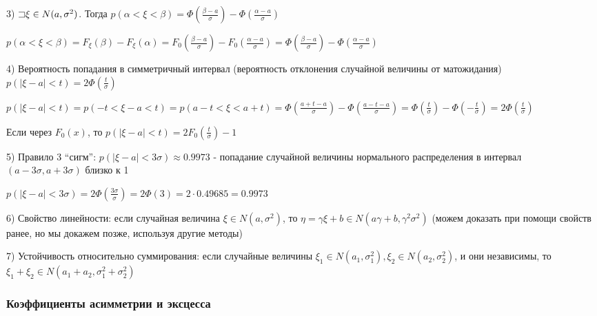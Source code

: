 \documentclass[12pt]{article}
\begin{document}
    3) $\mathord{\sqsupset} \xi \in N(a, \sigma^2)$. Тогда $p(\alpha < \xi < \beta) = \Phi\left(\frac{\beta - a}{\sigma}\right) - \Phi\left(\frac{\alpha - a}{\sigma}\right)$

    \begin{MyProof}
        $p(\alpha < \xi < \beta) = F_\xi(\beta) - F_\xi(\alpha) = F_0\left(\frac{\beta - a}{\sigma}\right) - F_0\left(\frac{\alpha - a}{\sigma}\right) = \Phi\left(\frac{\beta - a}{\sigma}\right) - \Phi\left(\frac{\alpha - a}{\sigma}\right)$
    \end{MyProof}

    4) Вероятность попадания в симметричный интервал (вероятность отклонения случайной величины от матожидания) 
    $p(|\xi - a| < t) = 2\Phi\left(\frac{t}{\sigma}\right)$

    \begin{MyProof}
        $p(|\xi - a| < t) = p(-t < \xi - a < t) = p(a - t < \xi < a + t) = \Phi\left(\frac{a + t - a}{\sigma}\right) - \Phi\left(\frac{a - t - a}{\sigma}\right) = \Phi\left(\frac{t}{\sigma}\right) - \Phi\left(-\frac{t}{\sigma}\right) = 2\Phi\left(\frac{t}{\sigma}\right)$
    \end{MyProof}

    \Notas Если через $F_0(x)$, то $p(|\xi - a| < t) = 2F_0\left(\frac{t}{\sigma}\right) - 1$

    5) Правило 3 \enquote{сигм}: $p(|\xi - a| < 3\sigma) \approx 0.9973$ - попадание случайной величины нормального распределения в интервал $(a - 3\sigma, a + 3\sigma)$ близко к 1

    \begin{MyProof}
        $p(|\xi - a| < 3\sigma) = 2\Phi\left(\frac{3\sigma}{\sigma}\right) = 2\Phi(3) = 2 \cdot 0.49685 = 0.9973$
    \end{MyProof}

    6) Свойство линейности: если случайная величина $\xi \in N(a, \sigma^2)$, то $\eta = \gamma \xi + b \in N(a \gamma + b, \gamma^2 \sigma^2)$ (можем доказать при помощи свойств ранее, но мы докажем позже, используя другие методы)

    7) Устойчивость относительно суммирования: если случайные величины $\xi_1 \in N(a_1, \sigma_1^2), \xi_2 \in N(a_2, \sigma_2^2)$, и они независимы, то $\xi_1 + \xi_2 \in N(a_1 + a_2, \sigma^2_1 + \sigma^2_2)$

    \subsubsection{Коэффициенты асимметрии и эксцесса}
\end{document}
